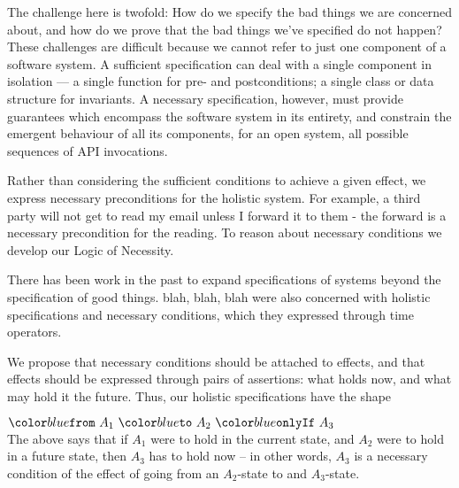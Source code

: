 The challenge here is twofold: How do we specify the bad things we are
concerned about, and how do we prove that the bad things we've
specified do not happen?  These challenges are difficult because we
cannot refer to just one component of a software system.  A sufficient
specification can deal with a single component in isolation --- a
single function for pre- and postconditions; a single class or data
structure for invariants. A necessary specification, however, must
provide guarantees which encompass the software system in its
entirety, and constrain the emergent behaviour of all its components,
for an open system, all possible sequences of API invocations.


 Rather than considering the sufficient conditions to
achieve a given effect, we express necessary preconditions for the
holistic system. For example, a third party will not get to read my
email unless I forward it to them - the forward is a necessary
precondition for the reading. To reason about necessary conditions we
develop our Logic of Necessity. 

 

There has been work in the past to expand specifications of systems beyond the specification of good things.  blah, blah, blah   \citeauthor{FASE} were also concerned with 
 holistic specifications and necessary conditions, which they expressed through time operators.
 
We propose that necessary conditions should be attached to effects, and that 
 effects should be expressed through pairs of assertions: what holds now, and what may hold it the future. Thus, our holistic specifications have the shape\\
\strut \hspace{1.5in} $\onlyIf {A_1} {A_2} {A_3}$ \\
\noindent
The above says that if $A_1$ were to hold in the current state, and $A_2$ were to hold in a future state,
then $A_3$ has to hold now -- in other words, $A_3$ is a necessary condition of  the effect of going
from an $A_2$-state to and $A_3$-state.

